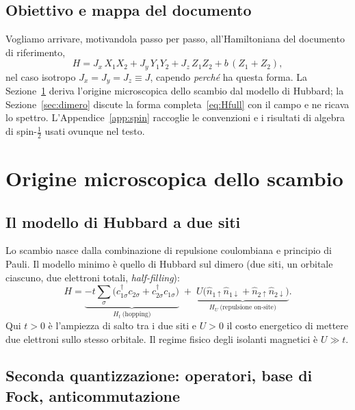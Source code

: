 \documentclass[11pt,a4paper]{article}
\newcommand{\up}{\uparrow}
\newcommand{\dn}{\downarrow}
\newcommand{\dg}{\dagger}
\newcommand{\opn}{\hat{n}}
\theoremstyle{definition}
\theoremstyle{remark}
\begin{document}
\subsection{Obiettivo e mappa del documento}
Vogliamo arrivare, motivandola passo per passo, all'Hamiltoniana del documento di riferimento,
\begin{equation}
H = J_x\,X_1X_2 + J_y\,Y_1Y_2 + J_z\,Z_1Z_2 + b\,(Z_1+Z_2),
\label{eq:Hfull}
\end{equation}
nel caso isotropo $J_x=J_y=J_z\equiv J$, capendo \emph{perché} ha questa forma. La Sezione~\ref{sec:hubbard}
deriva l'origine microscopica dello scambio dal modello di Hubbard; la Sezione~\ref{sec:dimero} discute la
forma completa~\eqref{eq:Hfull} con il campo e ne ricava lo spettro. L'Appendice~\ref{app:spin} raccoglie
le convenzioni e i risultati di algebra di spin-$\tfrac12$ usati ovunque nel testo.

\FloatBarrier
\section{Origine microscopica dello scambio}
\label{sec:hubbard}

\subsection{Il modello di Hubbard a due siti}

Lo scambio nasce dalla combinazione di repulsione coulombiana e principio di Pauli. Il modello minimo è
quello di Hubbard sul dimero (due siti, un orbitale ciascuno, due elettroni totali, \emph{half-filling}):
\begin{equation}
H = \underbrace{-t\sum_{\sigma}\!\big(c_{1\sigma}^{\dg}c_{2\sigma}+c_{2\sigma}^{\dg}c_{1\sigma}\big)}_{H_t\ \text{(hopping)}}
\;+\;\underbrace{U\big(\opn_{1\up}\opn_{1\dn}+\opn_{2\up}\opn_{2\dn}\big)}_{H_U\ \text{(repulsione on-site)}}.
\label{eq:hubbard}
\end{equation}
Qui $t>0$ è l'ampiezza di salto tra i due siti e $U>0$ il costo energetico di mettere due elettroni sullo
stesso orbitale. Il regime fisico degli isolanti magnetici è $U\gg t$.

\subsection{Seconda quantizzazione: operatori, base di Fock, anticommutazione}
\end{document}
